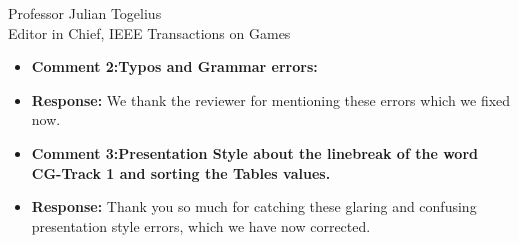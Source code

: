 \documentclass[10pt]{letter} %
\begin{document}
\begin{letter}{Professor Julian Togelius \\ Editor in Chief, IEEE Transactions on Games}
\begin{enumerate}
\begin{itemize}
		We have added this text to the paper in order to clarify what we
		understand by fitnessless:
		{\em Although this selection uses a score that could be assimilated to a fitness, it's actually an extension of a tournament selection policy since it creates tournaments of several individuals, and ``scores'' them according to how they fare in these races. This is not actually a fitness, since it's not intrinsic to the individual. It's equivalent to, in a $n$-tournament selection that is repeated several times, giving a score of $n$ to the first, $n-1$ to the second, and then using this for selection. That score is, thus, not a fitness but actually a way of keeping track of the position of the individual in the different tournaments it's participated.}
		\item {\bf Comment 2:Typos and Grammar errors:}
		\item {\bf Response:} We thank the reviewer for mentioning these errors which we fixed now. 
		\item {\bf Comment 3:Presentation Style about the linebreak of the word CG-Track 1 and sorting the Tables values.}
		\item {\bf Response:} Thank you so much for catching these glaring and confusing presentation style errors, which we have now corrected.
              \end{itemize}





\end{enumerate}
\end{letter}
\end{document}
